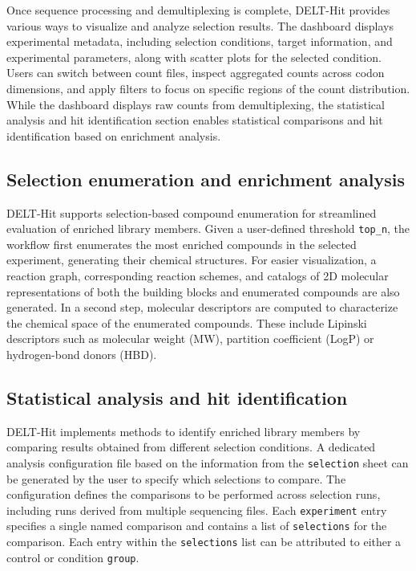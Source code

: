 \documentclass[pdflatex,sn-nature]{sn-jnl}
\begin{document}
Once sequence processing and demultiplexing is complete, DELT-Hit provides various ways to visualize and analyze selection results. The dashboard displays experimental metadata, including selection conditions, target information, and experimental parameters, along with scatter plots for the selected condition. Users can switch between count files, inspect aggregated counts across codon dimensions, and apply filters to focus on specific regions of the count distribution. While the dashboard displays raw counts from demultiplexing, the statistical analysis and hit identification section enables statistical comparisons and hit identification based on enrichment analysis. 

\subsection{Selection enumeration and enrichment analysis}

DELT-Hit supports selection-based compound enumeration for streamlined evaluation of enriched library members. Given a user-defined threshold \texttt{top\_n}, the workflow first enumerates the most enriched compounds in the selected experiment, generating their chemical structures. For easier visualization, a reaction graph, corresponding reaction schemes, and catalogs of 2D molecular representations of both the building blocks and enumerated compounds are also generated. In a second step, molecular descriptors are computed to characterize the chemical space of the enumerated compounds. These include Lipinski descriptors such as molecular weight (MW), partition coefficient (LogP) or hydrogen-bond donors (HBD).

\subsection{Statistical analysis and hit identification}

DELT-Hit implements methods to identify enriched library members by comparing results obtained from different selection conditions. A dedicated analysis configuration file based on the information from the \texttt{selection} sheet can be generated by the user to specify which selections to compare. The configuration defines the comparisons to be performed across selection runs, including runs derived from multiple sequencing files. Each \texttt{experiment} entry specifies a single named comparison and contains a list of \texttt{selections} for the comparison. Each entry within the \texttt{selections} list can be attributed to either a control or condition \texttt{group}. 
\end{document}
